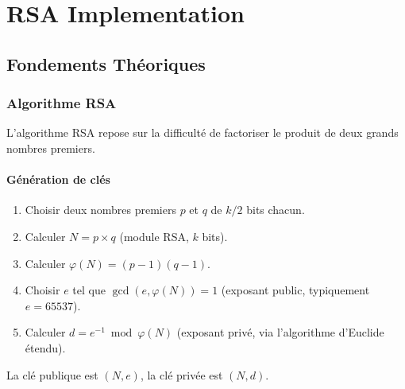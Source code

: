 %
%
%
%


\chapter{RSA Implementation}


\section{Fondements Théoriques}
\label{ch:theory}

\subsection{Algorithme RSA}
L'algorithme RSA repose sur la difficulté de factoriser le produit de
deux grands nombres premiers.

\subsubsection{Génération de clés}
\begin{enumerate}
  \item Choisir deux nombres premiers $p$ et $q$ de $k/2$ bits chacun.
  \item Calculer $N = p \times q$ \quad (module RSA, $k$ bits).
  \item Calculer $\varphi(N) = (p-1)(q-1)$.
  \item Choisir $e$ tel que $\gcd(e, \varphi(N)) = 1$ (exposant public,
        typiquement $e = 65537$).
  \item Calculer $d = e^{-1} \bmod \varphi(N)$ (exposant privé, via
        l'algorithme d'Euclide étendu).
\end{enumerate}
La clé publique est $(N, e)$, la clé privée est $(N, d)$.

